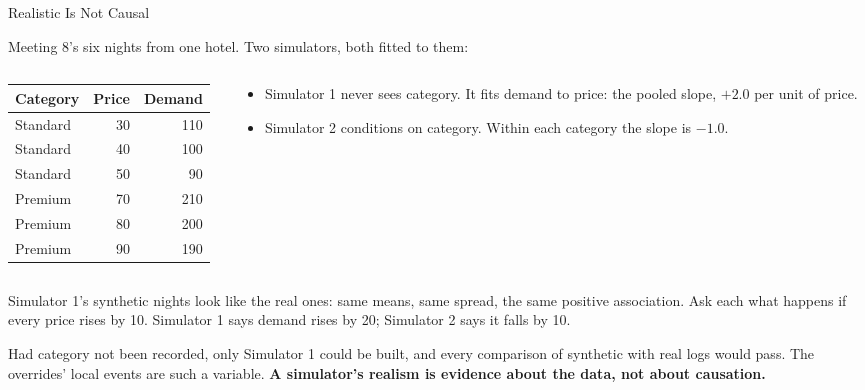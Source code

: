 \documentclass[aspectratio=169, 11pt, handout]{beamer}
\begin{document}
\begin{frame}{Realistic Is Not Causal}

Meeting 8's six nights from one hotel. Two simulators, both fitted to them:

\begin{columns}[c]
\begin{column}{0.42\textwidth}
\begin{center}
\small
\begin{tabular}{lrr}
\toprule
\textbf{Category} & \textbf{Price} & \textbf{Demand} \\
\midrule
Standard & 30 & 110 \\
Standard & 40 & 100 \\
Standard & 50 & 90 \\
Premium & 70 & 210 \\
Premium & 80 & 200 \\
Premium & 90 & 190 \\
\bottomrule
\end{tabular}
\end{center}
\end{column}
\begin{column}{0.55\textwidth}
\begin{itemize}
  \item Simulator 1 never sees category. It fits demand to price: the pooled slope, $+2.0$ per unit of price.
  \item Simulator 2 conditions on category. Within each category the slope is $-1.0$.
\end{itemize}
\end{column}
\end{columns}

\medskip

Simulator 1's synthetic nights look like the real ones: same means, same spread, the same positive association. Ask each what happens if every price rises by 10. Simulator 1 says demand rises by 20; Simulator 2 says it falls by 10.

\medskip

Had category not been recorded, only Simulator 1 could be built, and every comparison of synthetic with real logs would pass. The overrides' local events are such a variable. \textbf{A simulator's realism is evidence about the data, not about causation.}
\end{frame}
\end{document}

